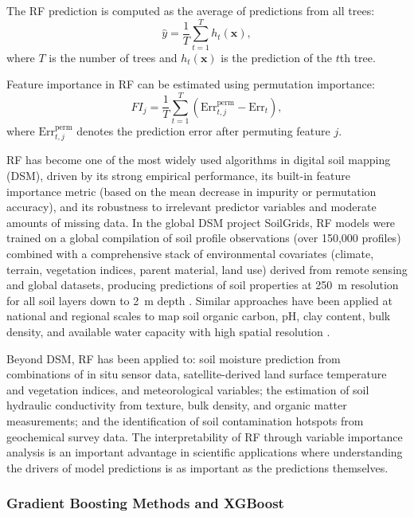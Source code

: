 \documentclass[land,review,accept,pdftex,oneauthor]{Definitions/mdpi}
\begin{document}
The RF prediction is computed as the average of predictions from all trees:
\begin{equation}
\hat{y}=\frac{1}{T}\sum_{t=1}^{T} h_t(\mathbf{x}),
\end{equation}
where $T$ is the number of trees and $h_t(\mathbf{x})$ is the prediction of the $t$th tree.

Feature importance in RF can be estimated using permutation importance:
\begin{equation}
FI_j=\frac{1}{T}\sum_{t=1}^{T}
\left(
\text{Err}_{t,j}^{\text{perm}}-\text{Err}_t
\right),
\end{equation}
where $\text{Err}_{t,j}^{\text{perm}}$ denotes the prediction error after permuting feature $j$.

RF has become one of the most widely used algorithms in digital soil mapping (DSM), driven by its strong empirical performance, its built-in feature importance metric (based on the mean decrease in impurity or permutation accuracy), and its robustness to irrelevant predictor variables and moderate amounts of missing data. In the global DSM project SoilGrids, RF models were trained on a global compilation of soil profile observations (over 150,000 profiles) combined with a comprehensive stack of environmental covariates (climate, terrain, vegetation indices, parent material, land use) derived from remote sensing and global datasets, producing predictions of soil properties at 250~m resolution for all soil layers down to 2~m depth \citep{Hengl2017,Poggio2021}. Similar approaches have been applied at national and regional scales to map soil organic carbon, pH, clay content, bulk density, and available water capacity with high spatial resolution \citep{Lemenkova202502,Lemenkova202501}.

Beyond DSM, RF has been applied to: soil moisture prediction from combinations of in situ sensor data, satellite-derived land surface temperature and vegetation indices, and meteorological variables; the estimation of soil hydraulic conductivity from texture, bulk density, and organic matter measurements; and the identification of soil contamination hotspots from geochemical survey data. The interpretability of RF through variable importance analysis is an important advantage in scientific applications where understanding the drivers of model predictions is as important as the predictions themselves.

\subsubsection{Gradient Boosting Methods and XGBoost}
\end{document}
